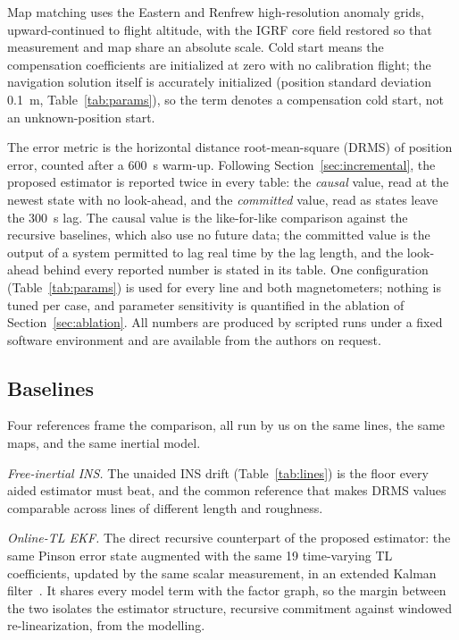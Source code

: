 Map matching uses the Eastern and Renfrew high-resolution anomaly grids,
upward-continued to flight altitude, with the IGRF core field restored so that
measurement and map share an absolute scale. Cold start means the compensation
coefficients are initialized at zero with no calibration flight; the navigation
solution itself is accurately initialized (position standard deviation
\SI{0.1}{\meter}, Table~\ref{tab:params}), so the term denotes a compensation
cold start, not an unknown-position start.

The error metric is the horizontal distance root-mean-square (DRMS) of position
error, counted after a \SI{600}{\second} warm-up. Following
Section~\ref{sec:incremental}, the proposed estimator is reported twice in every
table: the \emph{causal} value, read at the newest state with no look-ahead,
and the \emph{committed} value, read as states leave the \SI{300}{\second} lag.
The causal value is the like-for-like comparison against the recursive
baselines, which also use no future data; the committed value is the output of
a system permitted to lag real time by the lag length, and the look-ahead
behind every reported number is stated in its table. One configuration
(Table~\ref{tab:params}) is used for every line and both magnetometers; nothing
is tuned per case, and parameter sensitivity is quantified in the ablation of
Section~\ref{sec:ablation}. All numbers are produced by scripted runs under a
fixed software environment and are available from the authors on request.

\subsection{Baselines}\label{sec:baselines}
Four references frame the comparison, all run by us on the same lines, the same
maps, and the same inertial model.

\emph{Free-inertial INS.} The unaided INS drift (Table~\ref{tab:lines}) is the
floor every aided estimator must beat, and the common reference that makes DRMS
values comparable across lines of different length and roughness.

\emph{Online-TL EKF.} The direct recursive counterpart of the proposed
estimator: the same Pinson error state augmented with the same \num{19}
time-varying TL coefficients, updated by the same scalar measurement, in an
extended Kalman filter~\cite{gnadt2022}. It shares every model term with the
factor graph, so the margin between the two isolates the estimator structure,
recursive commitment against windowed re-linearization, from the modelling.

